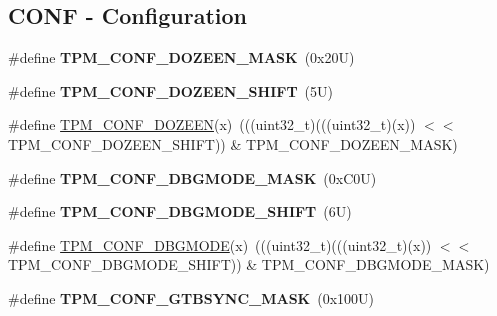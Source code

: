 \subsection*{C\+O\+NF -\/ Configuration}
\begin{DoxyCompactItemize}
\item 
\mbox{\label{group___t_p_m___register___masks_ga3588ec19d239de2ab13d4305b2beb96a}} 
\#define {\bfseries T\+P\+M\+\_\+\+C\+O\+N\+F\+\_\+\+D\+O\+Z\+E\+E\+N\+\_\+\+M\+A\+SK}~(0x20\+U)
\item 
\mbox{\label{group___t_p_m___register___masks_gad0be3a285e31316fb01fe11d311531d6}} 
\#define {\bfseries T\+P\+M\+\_\+\+C\+O\+N\+F\+\_\+\+D\+O\+Z\+E\+E\+N\+\_\+\+S\+H\+I\+FT}~(5\+U)
\item 
\#define \mbox{\hyperlink{group___t_p_m___register___masks_ga68f20aa76ed528653fb720d823511c46}{T\+P\+M\+\_\+\+C\+O\+N\+F\+\_\+\+D\+O\+Z\+E\+EN}}(x)~(((uint32\+\_\+t)(((uint32\+\_\+t)(x)) $<$$<$ T\+P\+M\+\_\+\+C\+O\+N\+F\+\_\+\+D\+O\+Z\+E\+E\+N\+\_\+\+S\+H\+I\+FT)) \& T\+P\+M\+\_\+\+C\+O\+N\+F\+\_\+\+D\+O\+Z\+E\+E\+N\+\_\+\+M\+A\+SK)
\item 
\mbox{\label{group___t_p_m___register___masks_gaf0d19de5100b155d1e946914e2d2756d}} 
\#define {\bfseries T\+P\+M\+\_\+\+C\+O\+N\+F\+\_\+\+D\+B\+G\+M\+O\+D\+E\+\_\+\+M\+A\+SK}~(0x\+C0\+U)
\item 
\mbox{\label{group___t_p_m___register___masks_ga25ea1086410a263c975c77f31e18079c}} 
\#define {\bfseries T\+P\+M\+\_\+\+C\+O\+N\+F\+\_\+\+D\+B\+G\+M\+O\+D\+E\+\_\+\+S\+H\+I\+FT}~(6\+U)
\item 
\#define \mbox{\hyperlink{group___t_p_m___register___masks_ga70aa3e6b93f7303ad7bc838330a45402}{T\+P\+M\+\_\+\+C\+O\+N\+F\+\_\+\+D\+B\+G\+M\+O\+DE}}(x)~(((uint32\+\_\+t)(((uint32\+\_\+t)(x)) $<$$<$ T\+P\+M\+\_\+\+C\+O\+N\+F\+\_\+\+D\+B\+G\+M\+O\+D\+E\+\_\+\+S\+H\+I\+FT)) \& T\+P\+M\+\_\+\+C\+O\+N\+F\+\_\+\+D\+B\+G\+M\+O\+D\+E\+\_\+\+M\+A\+SK)
\item 
\mbox{\label{group___t_p_m___register___masks_gab7b91078ebd94a6d143265c365020fef}} 
\#define {\bfseries T\+P\+M\+\_\+\+C\+O\+N\+F\+\_\+\+G\+T\+B\+S\+Y\+N\+C\+\_\+\+M\+A\+SK}~(0x100\+U)
\item 

\end{DoxyCompactItemize}
